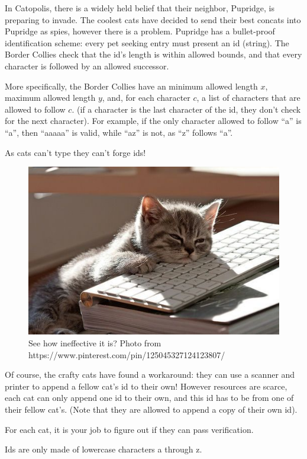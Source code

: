 
In Catopolis, there is a widely held belief that their neighbor, Pupridge, is preparing to invade. The coolest cats have decided to send their best concats into Pupridge as spies, however there is a problem. Pupridge has a bullet-proof identification scheme: every pet seeking entry must present an id (string). The Border Collies check that the id's length is within allowed bounds, and that every character is followed by an allowed successor. 

More specifically, the Border Collies have an minimum allowed length $x$, maximum allowed length $y$, and, for each character $c$, a list of characters that are allowed to follow $c$. (if a character is the last character of the id, they don't check for the next character). For example, if the only character allowed to follow ``a'' is ``a'', then ``aaaaa'' is valid, while ``az'' is not, as ``z'' follows ``a''.

As cats can't type they can't forge ids!

\begin{figure}[h]
	\begin{center}
	\includegraphics[height=0.3\textwidth]{catkeyboard}
	\caption{See how ineffective it is? Photo from https://www.pinterest.com/pin/125045327124123807/}
	\end{center}
\end{figure}

\medskip

Of course, the crafty cats have found a workaround: they can use a scanner and printer to append a fellow cat's id to their own! However resources are scarce, each cat can only append one id to their own, and this id has to be from one of their fellow cat's. (Note that they are allowed to append a copy of their own id).

\medskip

For each cat, it is your job to figure out if they can pass verification.

Ids are only made of lowercase characters a through z.

